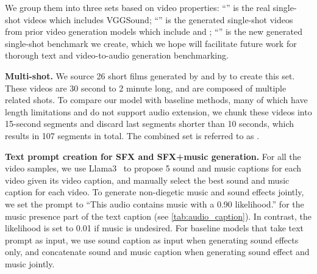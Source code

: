 We group them into three sets based on video properties:
``\OursAudioBenchSReal'' is the real single-shot videos which includes VGGSound;
``\OursAudioBenchSGen'' is the generated single-shot videos from prior video generation models which include \Sora and \RunwayGen;
``\OursAudioBench'' is the new generated single-shot benchmark we create, which we hope will facilitate future work for thorough text and video-to-audio generation benchmarking.

\noindent\textbf{Multi-shot.}
We source 26 short films generated by \Sora and by \OursVideo to create this set.
These videos are 30 second to 2 minute long, and are composed of multiple related shots.
To compare our model with baseline methods, many of which have length limitations and do not support audio extension, we chunk these videos into 15-second segments and discard last segments shorter than 10 seconds, which results in 107 segments in total.
The combined set is referred to as \OursAudioBenchMGen.

\noindent\textbf{Text prompt creation for SFX and SFX+music generation.}
For all the video samples, we use Llama3~\citep{llama3} to propose 5 sound and music captions for each video given its video caption,
and manually select the best sound and music caption for each video.
To generate non-diegetic music and sound effects jointly,
we set the prompt to ``This audio contains music with a 0.90 likelihood.'' for the music presence part of the text caption (see \cref{tab:audio_caption}).
In contrast, the likelihood is set to 0.01 if music is undesired.
For baseline models that take text prompt as input, we use sound caption as input when generating sound effects only,
and concatenate sound and music caption when generating sound effect and music jointly.
